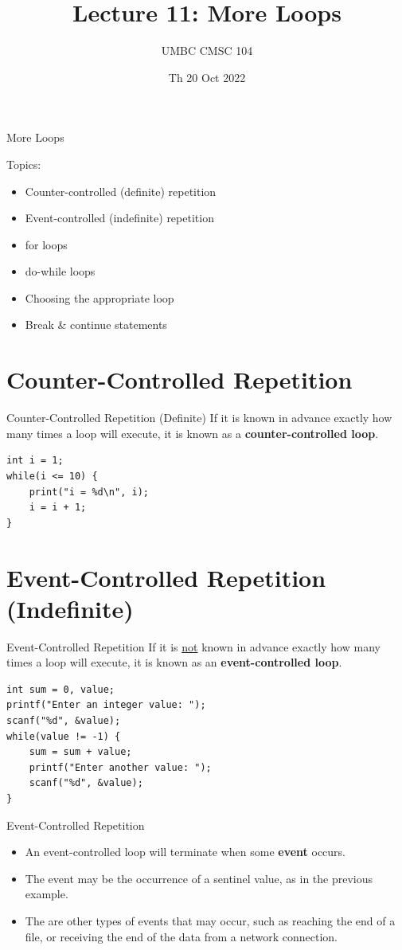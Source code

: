 \documentclass[graphics]{beamer}
\title{Lecture 11: More Loops}
\author{UMBC CMSC 104}
\date{Th 20 Oct 2022}
\begin{document}
\begin{frame}{}
\centering
    More Loops
\end{frame}

\begin{frame}
    Topics:
    \begin{itemize}
        \item Counter-controlled (definite) repetition
        \item Event-controlled (indefinite) repetition
        \item for loops
        \item do-while loops
        \item Choosing the appropriate loop
        \item Break \& continue statements
    \end{itemize}
\end{frame}

\section*{Counter-Controlled Repetition}
\begin{frame}[fragile]{Counter-Controlled Repetition (Definite)}
    If it is known in advance exactly how many times a loop will execute, it is known as a \textbf{counter-controlled loop}.
    \begin{verbatim}
int i = 1;
while(i <= 10) {
    print("i = %d\n", i);
    i = i + 1;
}
    \end{verbatim}
\end{frame}

    \section*{Event-Controlled Repetition (Indefinite)}
\begin{frame}[fragile]{Event-Controlled Repetition}
    If it is \underline{not} known in advance exactly how many times a loop will execute, it is known as an \textbf{event-controlled loop}.
    \begin{verbatim}
int sum = 0, value;
printf("Enter an integer value: ");
scanf("%d", &value);
while(value != -1) {
    sum = sum + value;
    printf("Enter another value: ");
    scanf("%d", &value);
}
    \end{verbatim}
\end{frame}

\begin{frame}{Event-Controlled Repetition}
    \begin{itemize}
        \item An event-controlled loop will terminate when some \textbf{event} occurs.
        \item The event may be the occurrence of a sentinel value, as in the previous example.
        \item The are other types of events that may occur, such as reaching the end of a file, or receiving the end of the data from a network connection.
    \end{itemize}
\end{frame}
\end{document}
